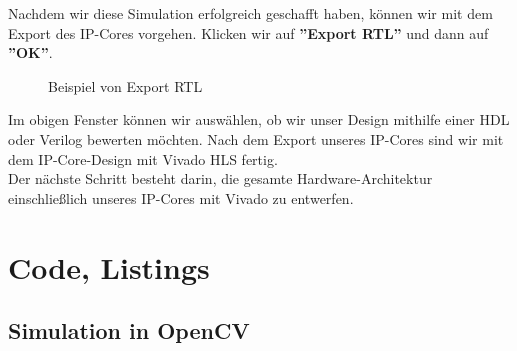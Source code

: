 \documentclass[a4paper]{report}
\begin{document}
Nachdem wir diese Simulation erfolgreich geschafft haben, können wir mit dem Export des IP-Cores vorgehen.
Klicken wir auf \textbf{''Export RTL''} und dann auf \textbf{''OK''}.\\

\begin{figure}[H]
\centering
{}
\caption{Beispiel von Export RTL}
\label{fig:Export_RTL}
\end{figure}


Im obigen Fenster können wir auswählen, ob wir unser Design mithilfe einer HDL oder Verilog bewerten möchten.
Nach dem Export unseres IP-Cores sind wir mit dem IP-Core-Design mit Vivado HLS fertig.\\

Der nächste Schritt besteht darin, die gesamte Hardware-Architektur einschließlich unseres IP-Cores mit Vivado zu entwerfen.



\section{Code, Listings}

\subsection{Simulation in OpenCV}
\end{document}
